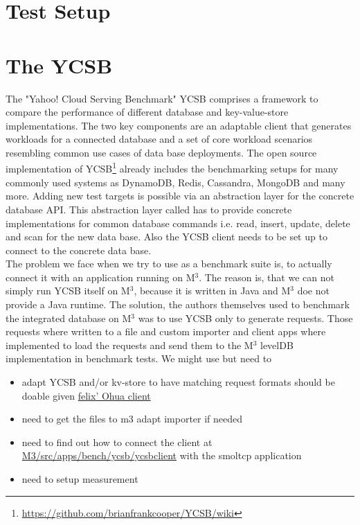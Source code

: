 \section{Test Setup}
\section{The YCSB}

The "Yahoo! Cloud Serving Benchmark" YCSB \cite{YSBC} comprises a framework to compare the performance of different database and key-value-store implementations. The two key components are an adaptable client that generates workloads for a connected database and a set of core workload scenarios resembling common use cases of data base deployments. The open source implementation of YCSB\footnote{\url{https://github.com/brianfrankcooper/YCSB/wiki}} already includes the benchmarking setups for many commonly used systems as DynamoDB, Redis, Cassandra, MongoDB and many more. Adding new test targets is possible via an abstraction layer for the concrete database API. This abstraction layer called  has to provide concrete implementations for common database commands i.e. read, insert, update, delete and scan for the new data base. Also the YCSB client needs to be set up to connect to the concrete data base. \\

The problem we face when we try to use as a benchmark suite is, to actually connect it with an application running on M$^3$. The reason is, that we can not simply run YCSB itself on M$^3$, because it is written in Java and M$^3$ doe not provide a Java runtime. 
The solution, the authors themselves used to benchmark the integrated database on M$^3$ was to use YCSB only to generate requests. Those requests where written to a file and custom importer and client apps where implemented to load the requests and send them to the M$^3$ levelDB implementation in benchmark tests. 
We might use but need to 
\begin{itemize}
    \item adapt YCSB and/or kv-store to have matching request formats
    \means should be doable given \href{https://github.com/Feliix42/YCSB/blob/master/ohua/src/main/java/site/ycsb/db/OhuaClient.java}{felix' Ohua client} 
    \item need to get the files to m3 adapt importer if needed
    \item need to find out how to connect the client at 
    \url{M3/src/apps/bench/ycsb/ycsbclient} with the smoltcp application 
    \item need to setup measurement    
\end{itemize}


